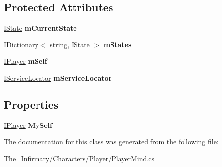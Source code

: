 \subsection*{Protected Attributes}
\begin{DoxyCompactItemize}
\item 
\mbox{\label{class_the___infirmary_1_1_characters_1_1_player_1_1_player_mind_a160627caaa822d3e8c16948d3a06e369}} 
\mbox{\hyperlink{interface_g_m_t_b_1_1_interfaces_1_1_i_state}{I\+State}} {\bfseries m\+Current\+State}
\item 
\mbox{\label{class_the___infirmary_1_1_characters_1_1_player_1_1_player_mind_a745d905924dfc05c37cc8844cec458b0}} 
I\+Dictionary$<$ string, \mbox{\hyperlink{interface_g_m_t_b_1_1_interfaces_1_1_i_state}{I\+State}} $>$ {\bfseries m\+States}
\item 
\mbox{\label{class_the___infirmary_1_1_characters_1_1_player_1_1_player_mind_a81b80425f8e00aebb77d7af3bd7c35e2}} 
\mbox{\hyperlink{interface_g_m_t_b_1_1_interfaces_1_1_i_player}{I\+Player}} {\bfseries m\+Self}
\item 
\mbox{\label{class_the___infirmary_1_1_characters_1_1_player_1_1_player_mind_a1c630dadc9053291a2d85f3928e150ae}} 
\mbox{\hyperlink{interface_g_m_t_b_1_1_interfaces_1_1_i_service_locator}{I\+Service\+Locator}} {\bfseries m\+Service\+Locator}
\end{DoxyCompactItemize}
\subsection*{Properties}
\begin{DoxyCompactItemize}
\item 
\mbox{\label{class_the___infirmary_1_1_characters_1_1_player_1_1_player_mind_a36d279d3cb5aa09f69687b0ded946139}} 
\mbox{\hyperlink{interface_g_m_t_b_1_1_interfaces_1_1_i_player}{I\+Player}} {\bfseries My\+Self}
\end{DoxyCompactItemize}


The documentation for this class was generated from the following file\+:\begin{DoxyCompactItemize}
\item 
The\+\_\+\+Infirmary/\+Characters/\+Player/Player\+Mind.\+cs\end{DoxyCompactItemize}
